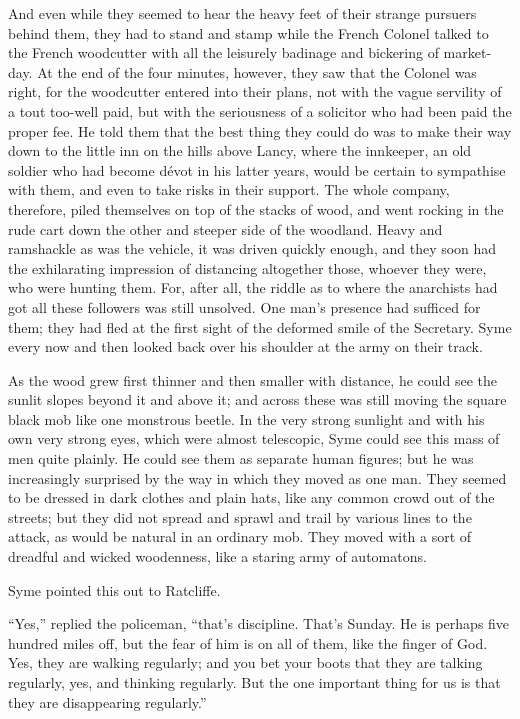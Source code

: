 And even while they seemed to hear the heavy feet of their strange pursuers behind them, they had to stand and stamp while the French Colonel talked to the French woodcutter with all the leisurely badinage and bickering of market-day. At the end of the four minutes, however, they saw that the Colonel was right, for the woodcutter entered into their plans, not with the vague servility of a tout too-well paid, but with the seriousness of a solicitor who had been paid the proper fee. He told them that the best thing they could do was to make their way down to the little inn on the hills above Lancy, where the innkeeper, an old soldier who had become dévot in his latter years, would be certain to sympathise with them, and even to take risks in their support. The whole company, therefore, piled themselves on top of the stacks of wood, and went rocking in the rude cart down the other and steeper side of the woodland. Heavy and ramshackle as was the vehicle, it was driven quickly enough, and they soon had the exhilarating impression of distancing altogether those, whoever they were, who were hunting them. For, after all, the riddle as to where the anarchists had got all these followers was still unsolved. One man’s presence had sufficed for them; they had fled at the first sight of the deformed smile of the Secretary. Syme every now and then looked back over his shoulder at the army on their track.

As the wood grew first thinner and then smaller with distance, he could see the sunlit slopes beyond it and above it; and across these was still moving the square black mob like one monstrous beetle. In the very strong sunlight and with his own very strong eyes, which were almost telescopic, Syme could see this mass of men quite plainly. He could see them as separate human figures; but he was increasingly surprised by the way in which they moved as one man. They seemed to be dressed in dark clothes and plain hats, like any common crowd out of the streets; but they did not spread and sprawl and trail by various lines to the attack, as would be natural in an ordinary mob. They moved with a sort of dreadful and wicked woodenness, like a staring army of automatons.

Syme pointed this out to Ratcliffe.

“Yes,” replied the policeman, “that’s discipline. That’s Sunday. He is perhaps five hundred miles off, but the fear of him is on all of them, like the finger of God. Yes, they are walking regularly; and you bet your boots that they are talking regularly, yes, and thinking regularly. But the one important thing for us is that they are disappearing regularly.”

